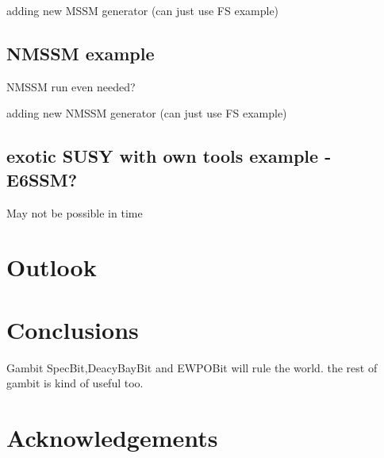 \documentclass[11pt,a4paper]{article}
\begin{document}
adding new MSSM generator (can just use FS example)
\subsection{NMSSM example}
NMSSM run even needed?

adding new NMSSM generator (can just use FS example)
\subsection{exotic SUSY with own tools example - E6SSM?}
May not be possible in time

\section{Outlook}

\section{Conclusions}
Gambit SpecBit,DeacyBayBit and EWPOBit will rule the world.  the rest of gambit is kind of useful too.
\section{Acknowledgements}
\end{document}
